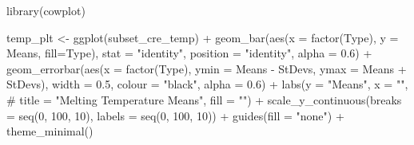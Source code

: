 \documentclass[
  letterpaper,
  DIV=11,
  numbers=noendperiod]{scrartcl}
\newenvironment{Shaded}{\begin{snugshade}}{\end{snugshade}}
\newcommand{\AttributeTok}[1]{\textcolor[rgb]{0.40,0.45,0.13}{#1}}
\newcommand{\CommentTok}[1]{\textcolor[rgb]{0.37,0.37,0.37}{#1}}
\newcommand{\DecValTok}[1]{\textcolor[rgb]{0.68,0.00,0.00}{#1}}
\newcommand{\FloatTok}[1]{\textcolor[rgb]{0.68,0.00,0.00}{#1}}
\newcommand{\FunctionTok}[1]{\textcolor[rgb]{0.28,0.35,0.67}{#1}}
\newcommand{\NormalTok}[1]{\textcolor[rgb]{0.00,0.23,0.31}{#1}}
\newcommand{\OtherTok}[1]{\textcolor[rgb]{0.00,0.23,0.31}{#1}}
\newcommand{\SpecialCharTok}[1]{\textcolor[rgb]{0.37,0.37,0.37}{#1}}
\newcommand{\StringTok}[1]{\textcolor[rgb]{0.13,0.47,0.30}{#1}}
\begin{document}
\begin{Shaded}
\begin{Highlighting}[]
\FunctionTok{library}\NormalTok{(cowplot)}

\NormalTok{temp\_plt }\OtherTok{\textless{}{-}} \FunctionTok{ggplot}\NormalTok{(subset\_cre\_temp) }\SpecialCharTok{+}
  \FunctionTok{geom\_bar}\NormalTok{(}\FunctionTok{aes}\NormalTok{(}\AttributeTok{x =} \FunctionTok{factor}\NormalTok{(Type), }
               \AttributeTok{y =}\NormalTok{ Means, }\AttributeTok{fill=}\NormalTok{Type),}
           \AttributeTok{stat =} \StringTok{"identity"}\NormalTok{, }\AttributeTok{position =} \StringTok{"identity"}\NormalTok{, }\AttributeTok{alpha =} \FloatTok{0.6}\NormalTok{) }\SpecialCharTok{+}
  \FunctionTok{geom\_errorbar}\NormalTok{(}\FunctionTok{aes}\NormalTok{(}\AttributeTok{x =} \FunctionTok{factor}\NormalTok{(Type), }
                    \AttributeTok{ymin =}\NormalTok{ Means }\SpecialCharTok{{-}}\NormalTok{ StDevs,}
                    \AttributeTok{ymax =}\NormalTok{ Means }\SpecialCharTok{+}\NormalTok{ StDevs),}
                \AttributeTok{width =} \FloatTok{0.5}\NormalTok{, }\AttributeTok{colour =} \StringTok{"black"}\NormalTok{, }\AttributeTok{alpha =} \FloatTok{0.6}\NormalTok{) }\SpecialCharTok{+}
  \FunctionTok{labs}\NormalTok{(}\AttributeTok{y =} \StringTok{"Means"}\NormalTok{, }\AttributeTok{x =} \StringTok{""}\NormalTok{, }
       \CommentTok{\# title = "Melting Temperature Means", }
       \AttributeTok{fill =} \StringTok{""}\NormalTok{) }\SpecialCharTok{+}
  \FunctionTok{scale\_y\_continuous}\NormalTok{(}\AttributeTok{breaks =} \FunctionTok{seq}\NormalTok{(}\DecValTok{0}\NormalTok{, }\DecValTok{100}\NormalTok{, }\DecValTok{10}\NormalTok{),}
                     \AttributeTok{labels =} \FunctionTok{seq}\NormalTok{(}\DecValTok{0}\NormalTok{, }\DecValTok{100}\NormalTok{, }\DecValTok{10}\NormalTok{)) }\SpecialCharTok{+}
  \FunctionTok{guides}\NormalTok{(}\AttributeTok{fill =} \StringTok{"none"}\NormalTok{) }\SpecialCharTok{+}
  \FunctionTok{theme\_minimal}\NormalTok{()}


\end{Highlighting}
\end{Shaded}
\end{document}
